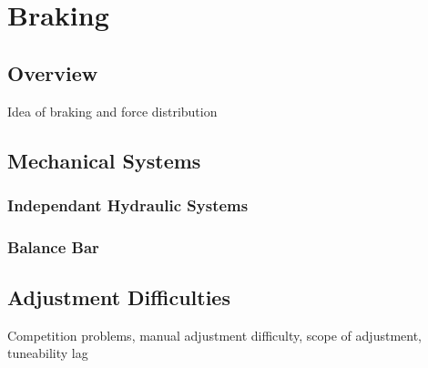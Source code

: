 \section{Braking}


\subsection{Overview}

Idea of braking and force distribution


\subsection{Mechanical Systems}


\subsubsection{Independant Hydraulic Systems}


\subsubsection{Balance Bar}


\subsection{Adjustment Difficulties}

Competition problems, manual adjustment difficulty, scope of adjustment,
tuneability lag
